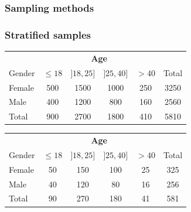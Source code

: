 \documentclass{beamer}
\begin{document}
\begin{frame}
  \frametitle{Sampling methods}
  \begin{center}
  \end{center}

\end{frame}

\begin{frame}
\frametitle{Stratified samples}

\begin{center}
    \begin{tabular}{l|cccc|c}
        & \multicolumn{4}{c|}{\textbf{Age}} & \\
        Gender & $\le 18$ & $]18,25]$ & $]25, 40]$ & $> 40$ & Total\\
        \hline
        Female & 500 & 1500 & 1000 & 250 & 3250 \\
        Male   & 400 & 1200 & 800 & 160 & 2560\\
        \hline
        Total  & 900 & 2700 & 1800 & 410 & 5810
    \end{tabular}
    
    \vspace{1cm}
    
    \pause
    \begin{tabular}{l|cccc|c}
        & \multicolumn{4}{c|}{\textbf{Age}} & \\
        Gender & $\le 18$ & $]18,25]$ & $]25, 40]$ & $> 40$ & Total\\
        \hline
        Female & 50 & 150 & 100 & 25 & 325 \\
        Male   & 40 & 120 & 80 & 16 & 256\\
        \hline
        Total & 90 & 270 & 180 & 41 & 581
    \end{tabular}
    
\end{center}
\end{frame}
\end{document}
